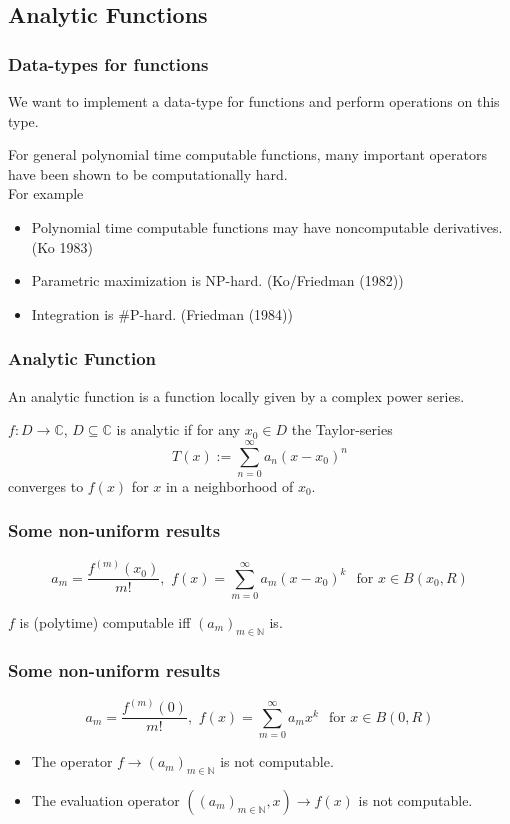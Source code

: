 \documentclass[xcolor=pdftex,dvipsnames,table,handout]{beamer}
\newcommand{\N}{\ensuremath{\mathbb{N}}}
\newcommand{\C}{\ensuremath{\mathbb{C}}}
\begin{document}
\subsection{Analytic Functions}
\begin{frame}
\frametitle{Data-types for functions}
We want to implement a data-type for functions and perform operations on this type.
\pause
\begin{fact}
For general polynomial time computable functions, many important operators have been shown to be computationally hard.\\
For example
\begin{itemize}
\item Polynomial time computable functions may have noncomputable derivatives. (Ko 1983)
\item Parametric maximization is NP-hard. (Ko/Friedman (1982))
\item Integration is \#P-hard. (Friedman (1984))
\end{itemize}
\end{fact}
\end{frame}
\begin{frame}
\frametitle{Analytic Function}
An analytic function is a function locally given by a complex power series.\\
\begin{definition}
$f : D \to \C $, $D \subseteq \C$ is analytic if for any $x_0 \in D$ the Taylor-series
$$ T(x) := \sum^\infty_{n=0} a_n(x-x_0)^n$$
converges to $f(x)$ for $x$ in a neighborhood of $x_0$.  
\end{definition}
\end{frame}
\begin{frame}
\frametitle{Some non-uniform results}

$$a_m =\frac{f^{(m)}(x_0)}{m!} 
, \,\, f(x) = \sum_{m=0}^\infty a_m(x-x_0)^k \,\ \text{ for } x \in B(x_0,R)
$$
\vfill
\begin{theorem}
$f$ is (polytime) computable iff $(a_m)_{m \in \N}$ is.
\end{theorem}
\end{frame}
\begin{frame}
\frametitle{Some non-uniform results}
$$a_m =\frac{f^{(m)}(0)}{m!} 
, \,\, f(x) = \sum_{m=0}^\infty a_mx^k \,\ \text{ for } x \in B(0,R)
$$
\vfill
\begin{theorem}[M\"uller (1995)]
\begin{itemize}
\item The operator $f \to (a_m)_{m \in \N}$ is not computable.
\item The evaluation operator $((a_m)_{m \in \N},x) \to f(x) $ is not computable.
\end{itemize}
\end{theorem}
\end{frame}
\end{document}
